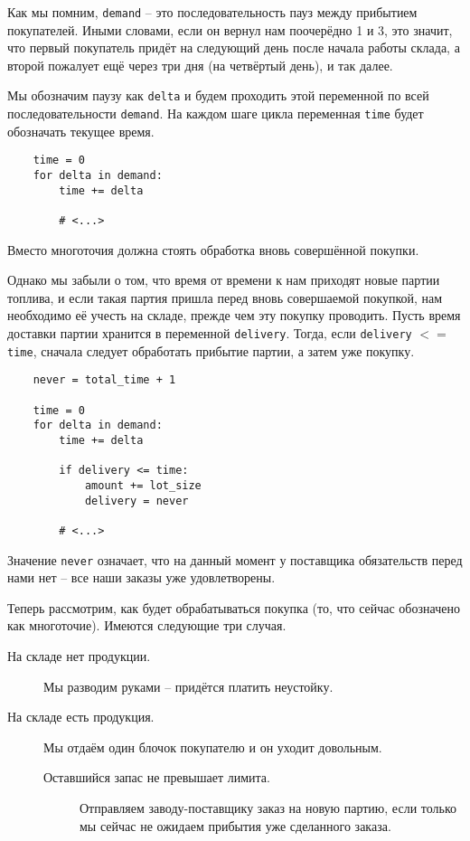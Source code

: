 \documentclass[12pt,final]{article}
\begin{document}
Как мы помним, \texttt{demand} -- это последовательность пауз между прибытием покупателей. Иными словами, если он вернул нам поочерёдно 1 и 3, это значит, что первый покупатель придёт на следующий день после начала работы склада, а второй пожалует ещё через три дня (на четвёртый день), и так далее.

Мы обозначим паузу как \texttt{delta} и будем проходить этой переменной по всей последовательности \texttt{demand}. На каждом шаге цикла переменная \texttt{time} будет обозначать текущее время.

\begin{verbatim}
    time = 0
    for delta in demand:
        time += delta
        
        # <...>
\end{verbatim}

Вместо многоточия должна стоять обработка вновь совершённой покупки.

Однако мы забыли о том, что время от времени к нам приходят новые партии топлива, и если такая партия пришла перед вновь совершаемой покупкой, нам необходимо её учесть на складе, прежде чем эту покупку проводить. Пусть время доставки партии хранится в переменной \texttt{delivery}. Тогда, если \texttt{delivery} $<=$ \texttt{time}, сначала следует обработать прибытие партии, а затем уже покупку.

\begin{verbatim}
    never = total_time + 1
    
    time = 0
    for delta in demand:
        time += delta
        
        if delivery <= time:
            amount += lot_size
            delivery = never
        
        # <...>
\end{verbatim}

Значение \texttt{never} означает, что на данный момент у поставщика обязательств перед нами нет -- все наши заказы уже удовлетворены.

Теперь рассмотрим, как будет обрабатываться покупка (то, что сейчас обозначено  как многоточие). Имеются следующие три случая.

\begin{description}
    \item[На складе нет продукции.] Мы разводим руками -- придётся платить неустойку.
    \item[На складе есть продукция.] Мы отдаём один блочок покупателю и он уходит довольным.
    \begin{description}
        \item[Оставшийся запас не превышает лимита.] Отправляем заводу-поставщику заказ на новую партию, если только мы сейчас не ожидаем прибытия уже сделанного заказа.
    \end{description}
\end{description}
\end{document}

